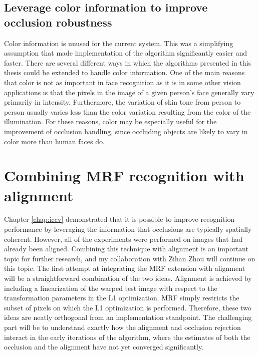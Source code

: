 \subsection{Leverage color information to improve occlusion robustness}  Color information is unused for the current system.  This was a simplifying assumption that made implementation of the algorithm significantly easier and faster.  There are several different ways in which the algorithms presented in this thesis could be extended to handle color information.  One of the main reasons that color is not as important in face recognition as it is in some other vision applications is that the pixels in the image of a given person's face generally vary primarily in intensity.  Furthermore, the variation of skin tone from person to person usually varies less than the color variation resulting from the color of the illumination.  For these reasons, color may be especially useful for the improvement of occlusion handling, since occluding objects are likely to vary in color more than human faces do.  


\section{Combining MRF recognition with alignment} Chapter \ref{chap:iccv} demonstrated that it is possible to improve recognition performance by leveraging the information that occlusions are typically spatially coherent.  However, all of the experiments were performed on images that had already been aligned.  Combining this technique with alignment is an important topic for further research, and my collaboration with Zihan Zhou will continue on this topic.  The first attempt at integrating the MRF extension with alignment will be a straightforward combination of the two ideas.  Alignment is achieved by including a linearization of the warped test image with respect to the transformation parameters in the L1 optimization.  MRF simply restricts the subset of pixels on which the L1 optimization is performed.  Therefore, these two ideas are neatly orthogonal from an implementation standpoint.  The challenging part will be to understand exactly how the alignment and occlusion rejection interact in the early iterations of the algorithm, where the estimates of both the occlusion and the alignment have not yet converged significantly.


